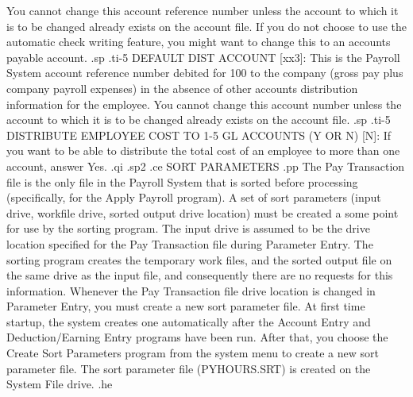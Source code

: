 You cannot change this account reference number
unless the account to which it is
to be changed already exists on the account file.  If you do not choose
to use the automatic check writing feature, you might want to change this
to an accounts payable account.
.sp
.ti-5
DEFAULT DIST ACCOUNT [xx3]: This is the Payroll System account reference
number debited for 100%
to the company (gross pay plus company payroll expenses)
in the absence of other
accounts distribution information for the employee.  You cannot change this
account number unless the account to which it is to be changed already
exists on the account file.
.sp
.ti-5
DISTRIBUTE EMPLOYEE COST TO 1-5 GL ACCOUNTS (Y OR N) [N]: If you want to
be able to distribute the total cost of an employee to more than one
account, answer Yes.
.qi
.sp2
.ce
SORT PARAMETERS
.pp
The Pay Transaction file is the only file in the Payroll System that is
sorted before processing (specifically, for the Apply Payroll
program).  A set of sort parameters (input drive, workfile drive, sorted
output drive location)
must be created a some point for use by the sorting program.
The input drive is assumed to be the drive location specified for the
Pay Transaction file during Parameter Entry.  The sorting program creates the
temporary
work files, and the sorted output file
on the same drive as the input file, and consequently
there are no requests
for this information.  Whenever the Pay Transaction file drive location
is changed in Parameter Entry, you must create a new sort parameter file.
At first time startup, the system creates one automatically after the
Account Entry and Deduction/Earning Entry programs have been run.  After
that, you choose the Create Sort Parameters program from the system menu
to create a new sort parameter file.  The sort parameter file (PYHOURS.SRT)
is created on the System File drive.
.he
